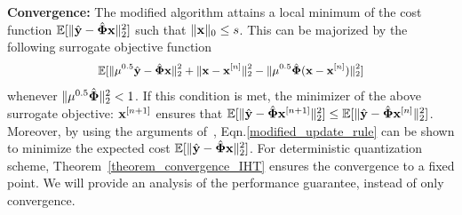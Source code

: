 \documentclass{article}
\begin{document}


{\bf Convergence:} The modified algorithm attains a local minimum of the cost function $\mathbb{E} [ \| \hat{\bf y} - \hat{\bf \Phi}{\bf x}\|_2^2]$ such that $\|{\bf x}\|_0 \leq s$. This can be majorized by the following surrogate objective function 
\begin{equation*}
\small
    \begin{split}
        \mathbb{E} [\|\mu^{0.5}\hat{\bf y} -   \hat{\bf \Phi}{\bf x}\|_2^2+ \|{\bf x} 
    - {\bf x}^{[n]} \|_2^2
    - \|\mu^{0.5}\hat{\bf \Phi}({\bf x}- {\bf x}^{[n]}) \|_2^2] 
    \end{split}
\end{equation*}
whenever $\| \mu^{0.5}\hat{\bf \Phi}\|_2^2 <1$. If this condition is met, the minimizer of the above surrogate objective: ${\bf x}^{[n+1]}$ ensures that $\mathbb{E} [\| \hat{\bf y} - \hat{\bf \Phi}{\bf x}^{[n+1]}\|_2^2] \leq \mathbb{E}[ \| \hat{\bf y} - \hat{\bf \Phi}{\bf x}^{[n]}\|_2^2]$. Moreover, by using the arguments of~\cite{blumensath2008iht}, Eqn.\ref{modified_update_rule} can be shown to minimize the expected cost $\mathbb{E} [ \| \hat{\bf y} - \hat{\bf \Phi}{\bf x}\|_2^2]$. For deterministic quantization scheme, Theorem~\ref{theorem_convergence_IHT} ensures the convergence to a fixed point. {We
will provide an analysis of the performance guarantee,
instead of only convergence.}
\end{document}

